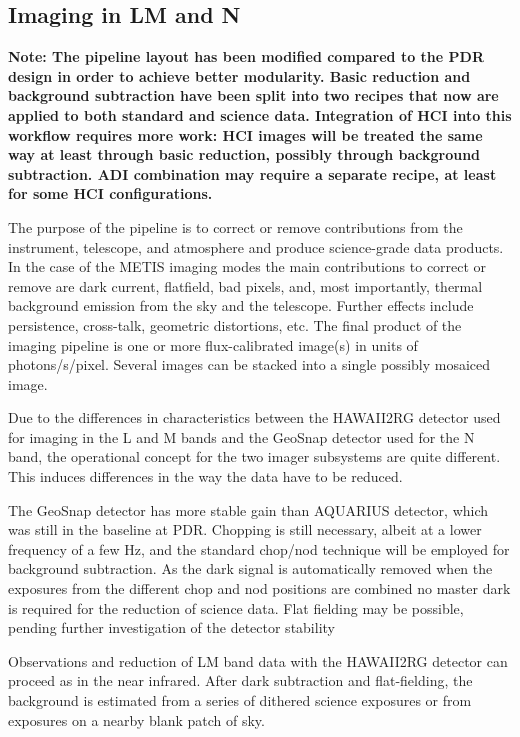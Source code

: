 \subsection{Imaging in LM and N}
\label{ssec:overview_lm_imaging}

\textbf{Note: The pipeline layout has been modified compared to the
  PDR design in order to achieve better modularity. Basic reduction
  and background subtraction have been split into two recipes that now
  are applied to both standard and science data. Integration of HCI
  into this workflow requires more work: HCI images will be treated
  the same way at least through basic reduction, possibly through
  background subtraction. ADI combination may require a separate
  recipe, at least for some HCI configurations.}

The purpose of the pipeline is to correct or remove contributions from
the instrument, telescope, and atmosphere and produce science-grade
data products.  In the case of the METIS imaging modes the main
contributions to correct or remove are dark current, flatfield, bad
pixels, and, most importantly, thermal background emission from the
sky and the telescope. Further effects include persistence,
cross-talk, geometric distortions, etc. The final product of the
imaging pipeline is one or more flux-calibrated image(s) in units of
photons/s/pixel. Several images can be stacked into a single possibly
mosaiced image.

Due to the differences in characteristics between the HAWAII2RG
detector used for imaging in the L and M bands and the GeoSnap
detector used for the N band, the operational concept for the two
imager subsystems are quite different. This induces differences in the
way the data have to be reduced.

The GeoSnap detector has more stable gain than AQUARIUS detector,
which was still in the baseline at PDR.  Chopping is still necessary,
albeit at a lower frequency of a few Hz, and the standard chop/nod
technique will be employed for background subtraction.  As the dark
signal is automatically removed when the exposures from the different
chop and nod positions are combined no master dark is required for the
reduction of science data. Flat fielding may be possible, pending
further investigation of the detector stability

Observations and reduction of LM band data with the HAWAII2RG detector
can proceed as in the near infrared. After dark subtraction and
flat-fielding, the background is estimated from a series of dithered
science exposures or from exposures on a nearby blank patch of sky.

